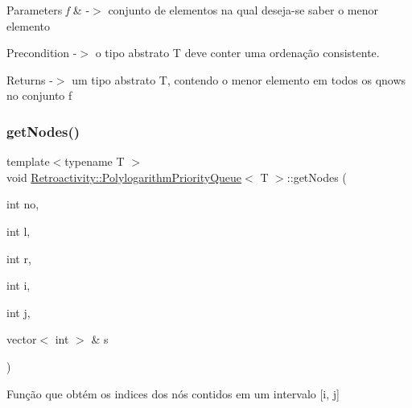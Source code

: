 \begin{DoxyParams}{Parameters}
{\em f} & -\/$>$ conjunto de elementos na qual deseja-\/se saber o menor elemento \\
\hline
\end{DoxyParams}
\begin{DoxyPrecond}{Precondition}
-\/$>$ o tipo abstrato T deve conter uma ordenação consistente. 
\end{DoxyPrecond}
\begin{DoxyReturn}{Returns}
-\/$>$ um tipo abstrato T, contendo o menor elemento em todos os qnow\textquotesingle{}s no conjunto f 
\end{DoxyReturn}
\mbox{\label{classRetroactivity_1_1PolylogarithmPriorityQueue_a18cda73d1563529c27cf8533c7bcfde2}} 
\subsubsection{\texorpdfstring{get\+Nodes()}{getNodes()}}
{\footnotesize\ttfamily template$<$typename T $>$ \\
void \hyperlink{classRetroactivity_1_1PolylogarithmPriorityQueue}{Retroactivity\+::\+Polylogarithm\+Priority\+Queue}$<$ T $>$\+::get\+Nodes (\begin{DoxyParamCaption}\item[{int}]{no,  }\item[{int}]{l,  }\item[{int}]{r,  }\item[{int}]{i,  }\item[{int}]{j,  }\item[{vector$<$ int $>$ \&}]{s }\end{DoxyParamCaption})}

Função que obtém os indices dos nós contidos em um intervalo \mbox{[}i, j\mbox{]}


